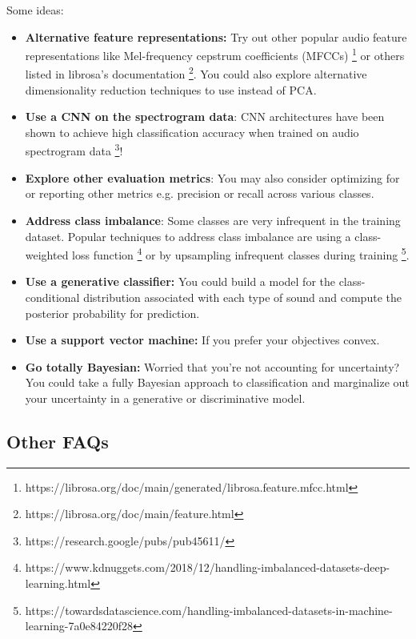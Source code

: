 \documentclass[12pt]{article}
\begin{document}
\noindent Some ideas:
\begin{itemize}
    \item \textbf{Alternative feature representations:}  Try out other popular audio feature representations like Mel-frequency cepstrum coefficients (MFCCs) \footnote{https://librosa.org/doc/main/generated/librosa.feature.mfcc.html} or others listed in librosa's documentation \footnote{https://librosa.org/doc/main/feature.html}.  You could also explore alternative dimensionality reduction techniques to use instead of PCA.
    
    \item \textbf{Use a CNN on the spectrogram data}: CNN architectures have been shown to achieve high classification accuracy when trained on audio spectrogram data \footnote{https://research.google/pubs/pub45611/}!
    
    \item \textbf{Explore other evaluation metrics}: You may also consider optimizing for or reporting other metrics e.g. precision or recall across various classes. 
    
    \item \textbf{Address class imbalance}: Some classes are very infrequent in the training dataset.  Popular techniques to address class imbalance are using a class-weighted loss function \footnote{https://www.kdnuggets.com/2018/12/handling-imbalanced-datasets-deep-learning.html} or by upsampling infrequent classes during training \footnote{https://towardsdatascience.com/handling-imbalanced-datasets-in-machine-learning-7a0e84220f28}.

    \item \textbf{Use a generative classifier:} You could build a model for the class-conditional distribution associated with each type of sound and compute the posterior probability for prediction.  
    
    \item \textbf{Use a support vector machine:} If you prefer your objectives convex.
    
    \item \textbf{Go totally Bayesian:} Worried that you're not accounting for uncertainty?  You could take a fully Bayesian approach to classification and marginalize out your uncertainty in a generative or discriminative model.
    
\end{itemize}


\subsection{Other FAQs}
\end{document}

